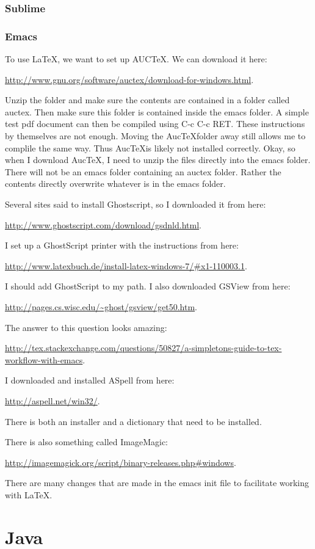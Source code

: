 \documentclass{article}
\newcommand{\web}[2]{
	\begin{center}
		\url{#1}{#2}
	\end{center}
}
\begin{document}
\subsubsection{Sublime}

\subsubsection{Emacs}
\label{subsubsec:LaTeX_Emacs}

To use \LaTeX, we want to set up AUC\TeX.
We can download it here:
	\web{http://www.gnu.org/software/auctex/download-for-windows.html}.
Unzip the folder and make sure the contents are contained in a folder called auctex.
Then make sure this folder is contained inside the emacs folder.
A simple test pdf document can then be compiled using C-c C-c RET.
These instructions by themselves are not enough.
Moving the Auc\TeX folder away still allows me to complile the same way.
Thus Auc\TeX is likely not installed correctly.
Okay, so when I download Auc\TeX, I need to unzip the files directly into the emacs folder.
There will not be an emacs folder containing an auctex folder.
Rather the contents directly overwrite whatever is in the emacs folder.

Several sites said to install Ghostscript, so I downloaded it from here:
	\web{http://www.ghostscript.com/download/gsdnld.html}.
I set up a GhostScript printer with the instructions from here:
	\web{http://www.latexbuch.de/install-latex-windows-7/\#x1-110003.1}.
I should add GhostScript to my path.
I also downloaded GSView from here:
	\web{http://pages.cs.wisc.edu/~ghost/gsview/get50.htm}.

The answer to this question looks amazing:
	\web{http://tex.stackexchange.com/questions/50827/a-simpletons-guide-to-tex-workflow-with-emacs}.

I downloaded and installed ASpell from here:
	\web{http://aspell.net/win32/}.
There is both an installer and a dictionary that need to be installed.

There is also something called ImageMagic:
	\web{http://imagemagick.org/script/binary-releases.php\#windows}.

There are many changes that are made in the emacs init file to facilitate working with \LaTeX.

\section{Java}
\end{document}
